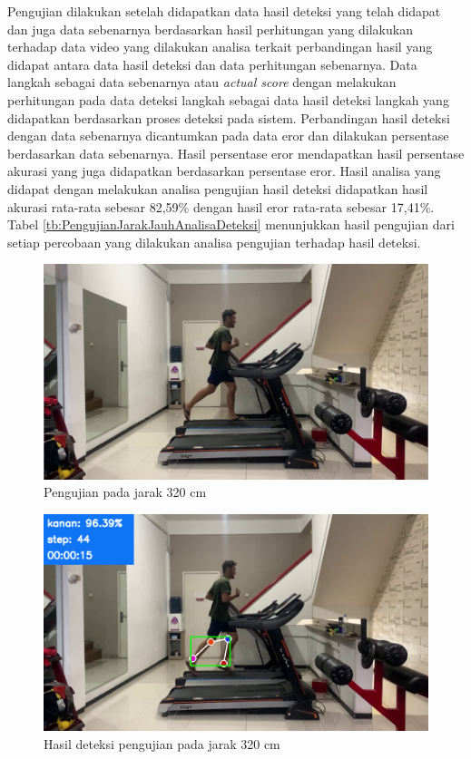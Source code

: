 Pengujian dilakukan setelah didapatkan data hasil deteksi yang telah didapat dan juga data sebenarnya berdasarkan hasil perhitungan yang dilakukan terhadap data video yang dilakukan analisa terkait perbandingan hasil yang didapat antara data hasil deteksi dan data perhitungan sebenarnya. Data langkah sebagai data sebenarnya atau \emph{actual score} dengan melakukan perhitungan pada data deteksi langkah sebagai data hasil deteksi langkah yang didapatkan berdasarkan proses deteksi pada sistem. Perbandingan hasil deteksi dengan data sebenarnya dicantumkan pada data eror dan dilakukan persentase berdasarkan data sebenarnya. Hasil persentase eror mendapatkan hasil persentase akurasi yang juga didapatkan berdasarkan persentase eror. Hasil analisa yang didapat dengan melakukan analisa pengujian hasil deteksi didapatkan hasil akurasi rata-rata sebesar 82,59\% dengan hasil eror rata-rata sebesar 17,41\%. Tabel \ref{tb:PengujianJarakJauhAnalisaDeteksi} menunjukkan hasil pengujian dari setiap percobaan yang dilakukan analisa pengujian terhadap hasil deteksi.

\begin{figure}[H]
  \centering
  \includegraphics[scale=0.46]{gambar/jarak_jauh.png}
  \caption{Pengujian pada jarak 320 cm}
  \label{fig:PengujianJarakJauh}
\end{figure}

\begin{figure}[H]
  \centering
  \includegraphics[scale=0.46]{gambar/jarak_jauh2.png}
  \caption{Hasil deteksi pengujian pada jarak 320 cm}
  \label{fig:PengujianJarakJauh2}
\end{figure}

